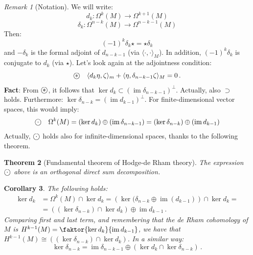 \documentclass[a4paper,11pt,titlepage, article, oneside]{memoir}
\numberwithin{equation}{section}
\newtheorem{theorem}{Theorem}[section]
\newtheorem{corollary}[theorem]{Corollary}
\theoremstyle{definition}
\theoremstyle{remark}
\newtheorem{remark}[theorem]{Remark}
\DeclareMathOperator{\im}{im}
\newcommand\oast{\stackMath\mathbin{\stackinset{c}{0ex}{c}{0ex}{\ast}{\bigcirc}}}
\newcommand\ocdot{\stackMath\mathbin{\stackinset{c}{0ex}{c}{0ex}{\cdot}{\bigcirc}}}
\begin{document}
\begin{remarkbox}\begin{remark}[Notation]
We will write:
$$d_k \colon \Omega^k(M) \rightarrow \Omega^{k+1}(M)$$
$$\delta_k \colon \Omega^{n-k}(M) \rightarrow \Omega^{n-k-1} (M)$$
Then: 
$$(-1)^k \delta_k \star = \star \delta_k$$
and $-\delta_k$ is the formal adjoint of $d_{n-k-1}$ (via $\langle \cdot, \cdot \rangle_M$).  In addition, $(-1)^k \delta_k$ is conjugate to $d_k$ (via $\star$).
Let's look again at the adjointness condition:
\begin{equation} \label{adjcondition}
\oast \quad \langle d_k \eta, \zeta \rangle _m + \langle \eta, \delta_{n-k-1} \zeta \rangle _M = 0 \, .
\end{equation}
\textbf{Fact}: From $\oast$, it follows that $\ker d_k \subset (\im \delta_{n-k-1})^{\bot}$. Actually, also $\supset$ holds. Furthermore: $\ker \delta_{n-k} = (\im d_{k-1})^{\bot}$.
For finite-dimensional vector spaces, this would imply:
\begin{equation}
\ocdot \quad \Omega^k(M) = (\ker d_k) \oplus (\im \delta_{n-k-1}) = (\ker \delta_{n-k}) \oplus (\im d_{k-1})
\end{equation}
Actually, $\ocdot$ holds also for infinite-dimensional spaces, thanks to the following theorem.
\end{remark}\end{remarkbox}

\begin{theorem}[Fundamental theorem of Hodge-de Rham theory]
The expression $\ocdot$ above is an orthogonal direct sum decomposition.
\end{theorem}

\begin{corollary} The following holds:
\begin{align}
\ker d_k &= \Omega^k(M) \cap \ker d_k = \left ( \ker (\delta_{n-k} \oplus \im(d_{k-1}) \right ) \cap \ker d_k = \\
&= \left ( (\ker \delta_{n-k}) \cap \ker d_k \right) \oplus \im d_{k-1} \, . \nonumber
\end{align}
Comparing first and last term, and remembering that the de Rham cohomology of $M$ is $H^{k-1}(M) = \faktor{\ker d_k}{\im d_{k-1}}$, we have that $H^{k-1}(M) \cong \left ( (\ker \delta_{n-k}) \cap \ker d_k \right)$. In a similar way:
\begin{equation}
\ker \delta_{n-k} = \im \delta_{n-k-1} \oplus \left ( \ker d_k \cap \ker \delta _{n-k} \right ) \, .
\end{equation}
\end{corollary}
\end{document}
